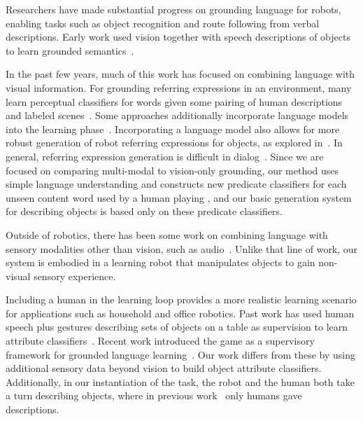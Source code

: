 Researchers have made substantial progress on grounding language for robots, enabling tasks such as object recognition and route following from verbal descriptions.
Early work used vision together with speech descriptions of objects to learn grounded semantics~\cite{roy:cogsci02}.

In the past few years, much of this work has focused on combining language with visual information.
For grounding referring expressions in an environment, many learn perceptual classifiers for words given some pairing of human descriptions and labeled scenes~\cite{liu:acl14,malinowski:nips14,mohan:acs13,sun:icra13,dindo:iros10,vogel:aaai10}.
Some approaches additionally incorporate language models into the learning phase~\cite{spranger:ijcai15,krishnamurthy:acl13,perera:aaai13,matuszek:icml12}.
Incorporating a language model also allows for more robust generation of robot referring expressions for objects, as explored in~\cite{tellex:rss14}.
In general, referring expression generation is difficult in dialog~\cite{fang:aaai14}.
Since we are focused on comparing multi-modal to vision-only grounding, our method uses simple language understanding and constructs new predicate classifiers for each unseen content word used by a human playing \ispy, and our basic generation system for describing objects is based only on these predicate classifiers.

Outside of robotics, there has been some work on combining language with sensory modalities other than vision, such as audio~\cite{kiela:emnlp15}.
Unlike that line of work, our system is embodied in a learning robot that manipulates objects to gain non-visual sensory experience.

Including a human in the learning loop provides a more realistic learning scenario for applications such as household and office robotics.
Past work has used human speech plus gestures describing sets of objects on a table as supervision to learn attribute classifiers~\cite{matuszek:aaai14,kollar:rss13}. Recent work introduced the \ispy game as a supervisory framework for grounded language learning~\cite{parde:ijcai15}.
Our work differs from these by using additional sensory data beyond vision to build object attribute classifiers. Additionally, in our instantiation of the \ispy task, the robot and the human both take a turn describing objects, where in previous work~\cite{parde:ijcai15} only humans gave descriptions.
